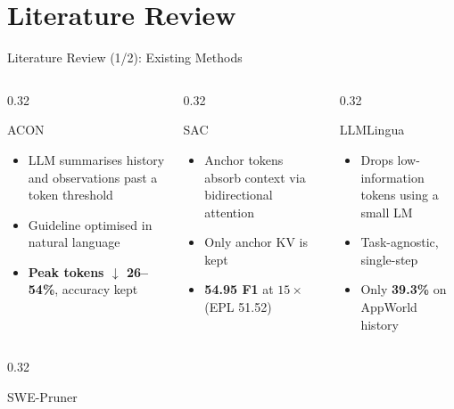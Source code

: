 \documentclass[aspectratio=169,10pt]{beamer}
\begin{document}
\section{Literature Review}
\begin{frame}{Literature Review (1/2): Existing Methods}
\begin{columns}[T]
\begin{column}{0.32\textwidth}
\begin{block}{ACON \cite{ACON}}
\footnotesize
\begin{itemize}
  \item LLM summarises history and observations past a token threshold
  \item Guideline optimised in natural language
  \item \textbf{Peak tokens $\downarrow$ 26--54\%}, accuracy kept
\end{itemize}
\end{block}
\end{column}
\begin{column}{0.32\textwidth}
\begin{block}{SAC \cite{SAC}}
\footnotesize
\begin{itemize}
  \item Anchor tokens absorb context via bidirectional attention
  \item Only anchor KV is kept
  \item \textbf{54.95 F1} at $15\times$ (EPL 51.52)
\end{itemize}
\end{block}
\end{column}
\begin{column}{0.32\textwidth}
\begin{block}{LLMLingua \cite{LLMLingua}}
\footnotesize
\begin{itemize}
  \item Drops low-information tokens using a small LM
  \item Task-agnostic, single-step
  \item Only \textbf{39.3\%} on AppWorld history
\end{itemize}
\end{block}
\end{column}
\end{columns}
\vspace{0.05cm}
\begin{columns}[T]
\begin{column}{0.32\textwidth}
\begin{block}{SWE-Pruner \cite{SWEPruner}}

\end{block}
\end{column}
\end{columns}
\end{frame}
\end{document}
